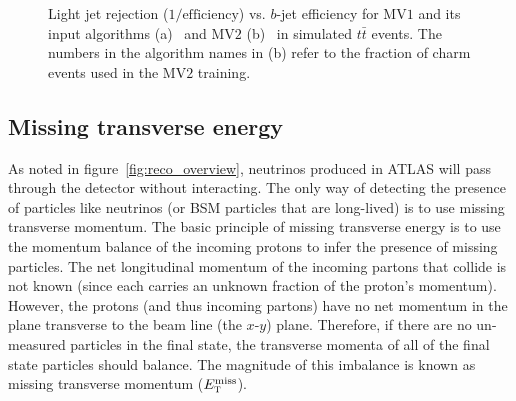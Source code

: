 \begin{figure}[h!]
   \caption{Light jet rejection ($1/\textrm{efficiency}$) vs. $b$-jet efficiency for MV$1$ and its input algorithms (a)~\cite{Run1BJets} and MV$2$ (b)~\cite{Run2BJets} in simulated $t\bar{t}$ events. The numbers in the algorithm names in (b) refer to the fraction of charm events used in the MV$2$ training.}
  \label{fig:bjets}
\end{figure}

\subsection{Missing transverse energy}

As noted in figure~\ref{fig:reco_overview}, neutrinos produced in ATLAS will pass through the detector without interacting. The only way of detecting the presence of particles like neutrinos (or BSM particles that are long-lived) is to use missing transverse momentum. The basic principle of missing transverse energy is to use the momentum balance of the incoming protons to infer the presence of missing particles. The net longitudinal momentum of the incoming partons that collide is not known (since each carries an unknown fraction of the proton's momentum). However, the protons (and thus incoming partons) have no net momentum in the plane transverse to the beam line (the $x$-$y$) plane. Therefore, if there are no un-measured particles in the final state, the transverse momenta of all of the final state particles should balance. The magnitude of this imbalance is known as missing transverse momentum ($E_{\textrm{\footnotesize\sc t}}^{\rm miss}$). 

